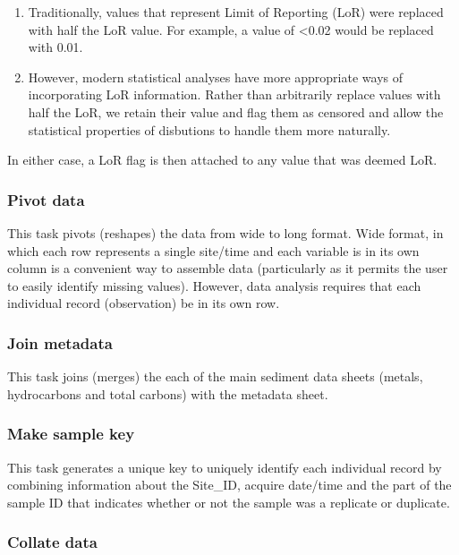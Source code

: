 \documentclass[
  8pt,
  a4paper]{article}
\providecommand{\tightlist}{%
  \setlength{\itemsep}{0pt}\setlength{\parskip}{0pt}}\usepackage{longtable,booktabs,array}
\begin{document}
\begin{enumerate}
\def\labelenumi{\arabic{enumi}.}
\tightlist
\item
  Traditionally, values that represent Limit of Reporting (LoR) were
  replaced with half the LoR value. For example, a value of
  \textless0.02 would be replaced with 0.01.
\item
  However, modern statistical analyses have more appropriate ways of
  incorporating LoR information. Rather than arbitrarily replace values
  with half the LoR, we retain their value and flag them as censored and
  allow the statistical properties of disbutions to handle them more
  naturally.
\end{enumerate}

In either case, a LoR flag is then attached to any value that was deemed
LoR.

\subsubsection{Pivot data}\label{pivot-data}

This task pivots (reshapes) the data from wide to long format. Wide
format, in which each row represents a single site/time and each
variable is in its own column is a convenient way to assemble data
(particularly as it permits the user to easily identify missing values).
However, data analysis requires that each individual record
(observation) be in its own row.

\subsubsection{Join metadata}\label{join-metadata}

This task joins (merges) the each of the main sediment data sheets
(metals, hydrocarbons and total carbons) with the metadata sheet.

\subsubsection{Make sample key}\label{make-sample-key}

This task generates a unique key to uniquely identify each individual
record by combining information about the Site\_ID, acquire date/time
and the part of the sample ID that indicates whether or not the sample
was a replicate or duplicate.

\subsubsection{Collate data}\label{collate-data}
\end{document}
